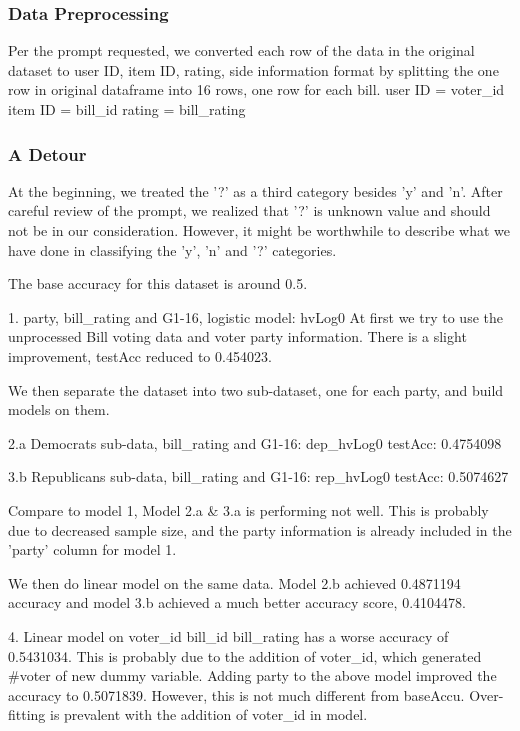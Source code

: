 \documentclass{article}
\begin{document}
\subsubsection{Data Preprocessing}
Per the prompt requested, we converted each row of the data in the original dataset to  user ID, item ID, rating, side information format by splitting the one row in original dataframe into 16 rows, one row for each bill.  \newline
user ID = voter\_id \newline
item ID = bill\_id  \newline
rating = bill\_rating  \newline
\subsubsection{A Detour}
At the beginning, we treated the '?' as a third category besides 'y' and 'n'. After careful review of the prompt, we realized that '?' is unknown value and should not be in our consideration. However, it might be worthwhile to describe what we have done in classifying the 'y', 'n' and '?' categories.

The base accuracy for this dataset is around 0.5.

1. party, bill\_rating and G1-16, logistic model: hvLog0
At first we try to use the unprocessed Bill voting data and voter party information. There is a slight improvement, testAcc reduced to 0.454023. 

We then separate the dataset into two sub-dataset, one for each party, and build models on them.

2.a Democrats sub-data, bill\_rating and G1-16: dep\_hvLog0
testAcc: 0.4754098
 
3.b Republicans sub-data, bill\_rating and G1-16: rep\_hvLog0
testAcc: 0.5074627

Compare to model 1, Model 2.a \& 3.a is performing not well. This is probably due to decreased sample size, and the party information is already included in the 'party' column for model 1.

We then do linear model on the same data. Model 2.b achieved 0.4871194 accuracy and model 3.b achieved a much better accuracy score, 0.4104478.

4. Linear model on voter\_id bill\_id bill\_rating has a worse accuracy of 0.5431034. This is probably due to the addition of voter\_id, which generated #voter of new dummy variable. 
Adding party to the above model improved the accuracy to 0.5071839. However, this is not much different from baseAccu. Over-fitting is prevalent with the addition of voter\_id in model. 
\end{document}
